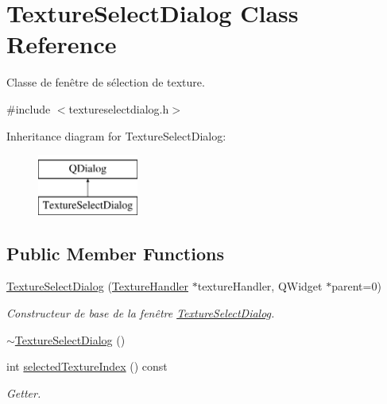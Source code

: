 \hypertarget{class_texture_select_dialog}{}\section{Texture\+Select\+Dialog Class Reference}
\label{class_texture_select_dialog}


Classe de fenêtre de sélection de texture.  




{\ttfamily \#include $<$textureselectdialog.\+h$>$}

Inheritance diagram for Texture\+Select\+Dialog\+:\begin{figure}[H]
\begin{center}
\leavevmode
\includegraphics[height=2.000000cm]{class_texture_select_dialog}
\end{center}
\end{figure}
\subsection*{Public Member Functions}
\begin{DoxyCompactItemize}
\item 
\hyperlink{class_texture_select_dialog_a76784e782a28dd37c8739cd93a77ee95}{Texture\+Select\+Dialog} (\hyperlink{class_texture_handler}{Texture\+Handler} $\ast$texture\+Handler, Q\+Widget $\ast$parent=0)
\begin{DoxyCompactList}\small\item\em Constructeur de base de la fenêtre \hyperlink{class_texture_select_dialog}{Texture\+Select\+Dialog}. \end{DoxyCompactList}\item 
\hyperlink{class_texture_select_dialog_afa8268eacb42fa8ff6b6372e7a8da9fd}{$\sim$\+Texture\+Select\+Dialog} ()
\item 
int \hyperlink{class_texture_select_dialog_aac9d46bff08b03776e5da51ffe5e8527}{selected\+Texture\+Index} () const 
\begin{DoxyCompactList}\small\item\em Getter. \end{DoxyCompactList}\end{DoxyCompactItemize}


